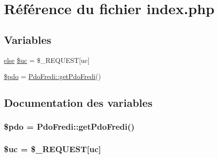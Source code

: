 \hypertarget{index_8php}{}\section{Référence du fichier index.\+php}
\label{index_8php}
\subsection*{Variables}
\begin{DoxyCompactItemize}
\item 
\hyperlink{v__newfrais_8php_ac0c3c895c28144f2c15e12d200579788}{else} \hyperlink{index_8php_a6526b74068ff2ebe2108e45792a4e7c8}{\$uc} = \$\+\_\+\+R\+E\+Q\+U\+E\+S\+T\mbox{[}\textquotesingle{}uc\textquotesingle{}\mbox{]}
\item 
\hyperlink{index_8php_a5766efd703cef0e00bfc06b3f3acbe0e}{\$pdo} = \hyperlink{class_pdo_fredi_a8476065871bfa97da916e3f167e4255d}{Pdo\+Fredi\+::get\+Pdo\+Fredi}()
\end{DoxyCompactItemize}


\subsection{Documentation des variables}
\hypertarget{index_8php_a5766efd703cef0e00bfc06b3f3acbe0e}{}
\subsubsection[{\$pdo}]{\setlength{\rightskip}{0pt plus 5cm}\$pdo = {\bf Pdo\+Fredi\+::get\+Pdo\+Fredi}()}\label{index_8php_a5766efd703cef0e00bfc06b3f3acbe0e}
\hypertarget{index_8php_a6526b74068ff2ebe2108e45792a4e7c8}{}
\subsubsection[{\$uc}]{ \$uc = \$\+\_\+\+R\+E\+Q\+U\+E\+S\+T\mbox{[}\textquotesingle{}uc\textquotesingle{}\mbox{]}}\label{index_8php_a6526b74068ff2ebe2108e45792a4e7c8}
